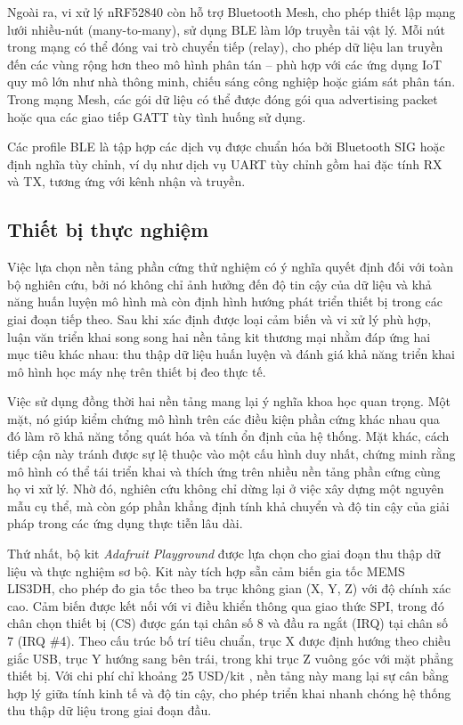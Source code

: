 Ngoài ra, vi xử lý nRF52840 còn hỗ trợ Bluetooth Mesh, cho phép thiết 
lập mạng lưới nhiều-nút (many-to-many), sử dụng BLE làm lớp truyền tải 
vật lý. Mỗi nút trong mạng có thể đóng vai trò chuyển tiếp (relay), 
cho phép dữ liệu lan truyền đến các vùng rộng hơn theo mô hình phân 
tán – phù hợp với các ứng dụng IoT quy mô lớn như nhà thông minh, 
chiếu sáng công nghiệp hoặc giám sát phân tán. Trong mạng Mesh, 
các gói dữ liệu có thể được đóng gói qua advertising packet hoặc 
qua các giao tiếp GATT tùy tình huống sử dụng.

Các profile BLE là tập hợp các dịch vụ được chuẩn hóa bởi Bluetooth 
SIG hoặc định nghĩa tùy chỉnh, ví dụ như dịch vụ UART tùy chỉnh gồm 
hai đặc tính RX và TX, tương ứng với kênh nhận và truyền.

\subsection{Thiết bị thực nghiệm}

Việc lựa chọn nền tảng phần cứng thử nghiệm có ý nghĩa quyết định đối với 
toàn bộ nghiên cứu, bởi nó không chỉ ảnh hưởng đến độ tin cậy của dữ liệu 
và khả năng huấn luyện mô hình mà còn định hình hướng phát triển thiết bị 
trong các giai đoạn tiếp theo. Sau khi xác định được loại cảm biến và vi xử 
lý phù hợp, luận văn triển khai song song hai nền tảng kit thương mại nhằm 
đáp ứng hai mục tiêu khác nhau: thu thập dữ liệu huấn luyện và đánh giá 
khả năng triển khai mô hình học máy nhẹ trên thiết bị đeo thực tế.  

Việc sử dụng đồng thời hai nền tảng mang lại ý 
nghĩa khoa học quan trọng. Một mặt, nó giúp kiểm 
chứng mô hình trên các điều kiện phần cứng khác 
nhau qua đó làm rõ khả năng tổng quát 
hóa và tính ổn định của hệ thống. Mặt khác, cách tiếp cận này tránh được sự lệ thuộc vào một cấu hình duy nhất, chứng minh rằng mô hình có thể tái triển khai và thích ứng trên nhiều nền tảng phần cứng cùng họ vi xử lý. Nhờ đó, nghiên cứu không chỉ dừng lại ở việc xây dựng một nguyên mẫu cụ thể, mà còn góp phần khẳng định tính khả chuyển và độ tin cậy của giải pháp trong các ứng dụng thực tiễn lâu dài.

Thứ nhất, bộ kit \textit{Adafruit Playground} được lựa chọn cho giai đoạn 
thu thập dữ liệu và thực nghiệm sơ bộ. Kit này tích hợp sẵn cảm biến gia tốc 
MEMS LIS3DH, cho phép đo gia tốc theo ba trục không gian (X, Y, Z) với độ 
chính xác cao. Cảm biến được kết nối với vi điều khiển thông qua giao thức 
SPI, trong đó chân chọn thiết bị (CS) được gán tại chân số 8 và đầu ra ngắt 
(IRQ) tại chân số 7 (IRQ \#4). Theo cấu trúc bố trí tiêu chuẩn, trục X được 
định hướng theo chiều giắc USB, trục Y hướng sang bên trái, trong khi trục Z 
vuông góc với mặt phẳng thiết bị. Với chi phí chỉ khoảng 25 USD/kit 
\cite{ada_overview}, nền tảng này mang lại sự cân bằng hợp lý giữa tính 
kinh tế và độ tin cậy, cho phép triển khai nhanh chóng hệ thống thu thập dữ 
liệu trong giai đoạn đầu.  

